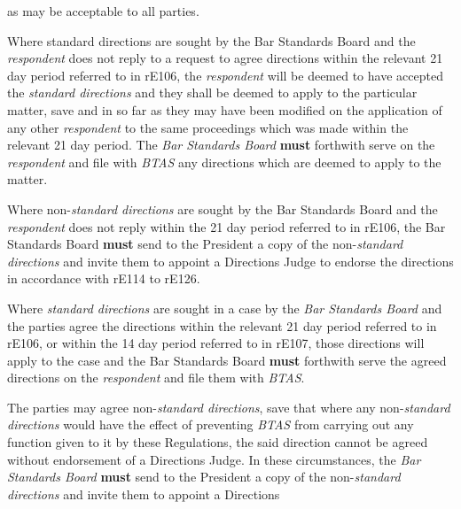 as may be acceptable to all parties.\ln
{}\par
{}
Where standard directions are sought by the Bar Standards Board and
the \emph{respondent} does not reply to a request to agree directions
within the relevant 21 day period referred to in rE106,
the \emph{respondent} will be deemed to have accepted the \emph{standard
directions} and they shall be deemed to apply to the particular matter,
save and in so far as they may have been modified on the application of
any other \emph{respondent} to the same proceedings which was made
within the relevant 21 day period. The \emph{Bar Standards Board}  \textcolor{myred}{\textbf{must}}
forthwith serve on the\emph{ respondent} and file with \emph{BTAS} any
directions which are deemed to apply to the matter.\\
\par
Where non-\emph{standard directions} are sought by the Bar Standards
Board and the \emph{respondent} does not reply within the 21 day period
referred to in rE106, the Bar Standards Board  \textcolor{myred}{\textbf{must}} send to the President
a copy of the non-\emph{standard directions} and invite them to appoint
a Directions Judge to endorse the directions in accordance with rE114 to
rE126.\\
\par
{}
Where \emph{standard directions} are sought in a case by the \emph{Bar
Standards Board} and the parties agree the directions within the
relevant 21 day period referred to in rE106, or within the 14 day period
referred to in rE107, those directions will apply to the case and the
Bar Standards Board  \textcolor{myred}{\textbf{must}} forthwith serve the agreed directions on
the \emph{respondent} and file them with \emph{BTAS}.\\
\par
The parties may agree non-\emph{standard directions}, save that where
any non-\emph{standard directions} would have the effect of
preventing \emph{BTAS} from carrying out any function given to it by
these Regulations, the said direction cannot be agreed without
endorsement of a Directions Judge. In these circumstances, the \emph{Bar
Standards Board}  \textcolor{myred}{\textbf{must}} send to the President a copy of the
non-\emph{standard directions} and invite them to appoint a Directions
